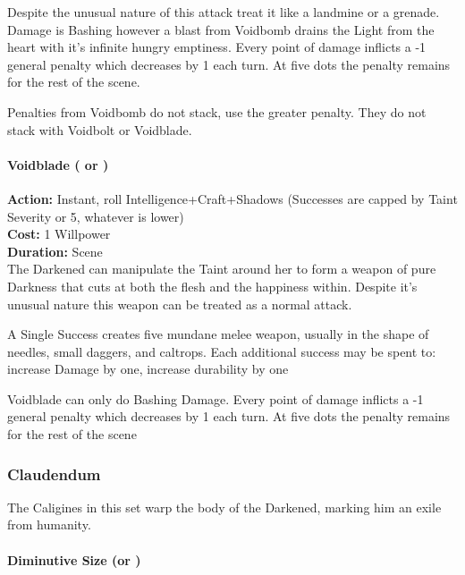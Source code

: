 Despite the unusual nature of this attack treat it like a landmine or a grenade. Damage is Bashing however a blast from Voidbomb drains the Light from the heart with it's infinite hungry emptiness. Every point of damage inflicts a -1 general penalty which decreases by 1 each turn. At five dots the penalty remains for the rest of the scene.

Penalties from Voidbomb do not stack, use the greater penalty. They do not stack with Voidbolt or Voidblade.\\

\paragraph*{Voidblade ( \textbullet\textbullet\textbullet or \textbullet\textbullet\textbullet\textbullet\textbullet)}

\noindent \textbf{Action:} Instant, roll Intelligence+Craft+Shadows (Successes are capped by Taint Severity or 5, whatever is lower)\\

\noindent \textbf{Cost:} 1 Willpower \\

\noindent \textbf{Duration:} Scene \\

\noindent The Darkened can manipulate the Taint around her to form a weapon of pure Darkness that cuts at both the flesh and the happiness within. Despite it's unusual nature this weapon can be treated as a normal attack.

A Single Success creates five mundane melee weapon, usually in the shape of needles, small daggers, and caltrops. Each additional success may be spent to: increase Damage by one, increase durability by one

Voidblade can only do Bashing Damage. Every point of damage inflicts a -1 general penalty which decreases by 1 each turn. At five dots the penalty remains for the rest of the scene\

\subsubsection*{Claudendum}

The Caligines in this set warp the body of the Darkened, marking him an exile from humanity. \\

\paragraph*{Diminutive Size (\textbullet or \textbullet\textbullet\textbullet)}

